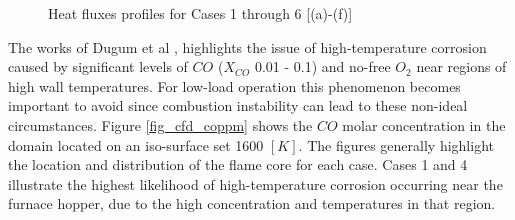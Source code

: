 \documentclass[review]{elsarticle}
\begin{document}
\begin{figure}[h!]
\hspace{5mm}
\caption{Heat fluxes profiles for Cases 1 through 6 [(a)-(f)]}
\label{fig_cfd_heat_flux}
\end{figure}

The works of Dugum et al \citep{Du2017}, highlights the issue of high-temperature corrosion caused by significant levels of $CO$ ($X_{CO}$ 0.01 - 0.1) and no-free $O_2$ near regions of high wall temperatures. For low-load operation this phenomenon becomes important to avoid since combustion instability can lead to these non-ideal circumstances. Figure \ref{fig_cfd_coppm} shows the $CO$ molar concentration in the domain located on an iso-surface set 1600 $[K]$. The figures generally highlight the location and distribution of the flame core for each case. Cases 1 and 4 illustrate the highest likelihood of high-temperature corrosion occurring near the furnace hopper, due to the high concentration and temperatures in that region.\\
\end{document}
